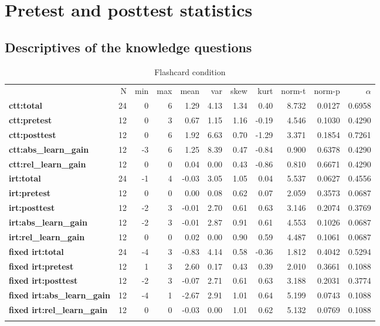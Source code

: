 \chapter{Pretest and posttest statistics}
\label{app:learning_gain}

\FloatBarrier
\section{Descriptives of the knowledge questions}

\begin{longtable}[c]{@{}lrrrrrrrrrr@{}}
\caption{Flashcard condition}\\
\endfirsthead
\endhead
\toprule\addlinespace
& N & min & max & mean & var & skew & kurt & norm-t &
norm-p & $\alpha$
\\
\addlinespace
\midrule
\textbf{ctt:total} & 24 & 0 & 6 & 1.29 & 4.13 & 1.34 & 0.40 & 8.732 &
0.0127 & 0.6958
\\\addlinespace
\textbf{ctt:pretest} & 12 & 0 & 3 & 0.67 & 1.15 & 1.16 & -0.19 & 4.546 &
0.1030 & 0.4290
\\\addlinespace
\textbf{ctt:posttest} & 12 & 0 & 6 & 1.92 & 6.63 & 0.70 & -1.29 & 3.371
& 0.1854 & 0.7261
\\\addlinespace
\textbf{ctt:abs\_learn\_gain} & 12 & -3 & 6 & 1.25 & 8.39 & 0.47 & -0.84
& 0.900 & 0.6378 & 0.4290
\\\addlinespace
\textbf{ctt:rel\_learn\_gain} & 12 & 0 & 0 & 0.04 & 0.00 & 0.43 & -0.86
& 0.810 & 0.6671 & 0.4290
\\\addlinespace
\textbf{irt:total} & 24 & -1 & 4 & -0.03 & 3.05 & 1.05 & 0.04 & 5.537 &
0.0627 & 0.4556
\\\addlinespace
\textbf{irt:pretest} & 12 & 0 & 0 & 0.00 & 0.08 & 0.62 & 0.07 & 2.059 &
0.3573 & 0.0687
\\\addlinespace
\textbf{irt:posttest} & 12 & -2 & 3 & -0.01 & 2.70 & 0.61 & 0.63 & 3.146
& 0.2074 & 0.3769
\\\addlinespace
\textbf{irt:abs\_learn\_gain} & 12 & -2 & 3 & -0.01 & 2.87 & 0.91 & 0.61
& 4.553 & 0.1026 & 0.0687
\\\addlinespace
\textbf{irt:rel\_learn\_gain} & 12 & 0 & 0 & 0.02 & 0.00 & 0.90 & 0.59 &
4.487 & 0.1061 & 0.0687
\\\addlinespace
\textbf{fixed irt:total} & 24 & -4 & 3 & -0.83 & 4.14 & 0.58 & -0.36
& 1.812 & 0.4042 & 0.5294
\\\addlinespace
\textbf{fixed irt:pretest} & 12 & 1 & 3 & 2.60 & 0.17 & 0.43 & 0.39 &
2.010 & 0.3661 & 0.1088
\\\addlinespace
\textbf{fixed irt:posttest} & 12 & -2 & 3 & -0.07 & 2.71 & 0.61 &
0.63 & 3.188 & 0.2031 & 0.3774
\\\addlinespace
\textbf{fixed irt:abs\_learn\_gain} & 12 & -4 & 1 & -2.67 & 2.91 &
1.01 & 0.64 & 5.199 & 0.0743 & 0.1088
\\\addlinespace
\textbf{fixed irt:rel\_learn\_gain} & 12 & 0 & 0 & -0.03 & 0.00 &
1.01 & 0.62 & 5.132 & 0.0769 & 0.1088
\\\addlinespace
\bottomrule
    \label{tab:know_fc}
\end{longtable}

